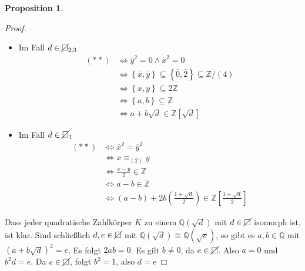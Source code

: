 \documentclass[
twoside=semi,
fontsize=12,
DIV=12, 
cleardoublepage=current,
leqno,
headings=optiontoheadandtoc, 
toc=idx
]{scrbook}
\newcommand{\Z}{\mathbb{Z}}
\newcommand{\Q}{\mathbb{Q}}
\newcommand{\nsquare}{\cancel{\square}}
\newcommand{\brac}[1]{\left( #1 \right)}
\newcommand{\set}[1]{\left\{ #1 \right\}}
\theoremstyle{definition}
\newtheorem{proposition}[definition]{Proposition}
\begin{document}
\begin{proposition}
\begin{proof}
 		\begin{itemize}
 			\item Im Fall $d\in \nsquare_{2,3}$
 			\begin{align*}
 				(**) &\Leftrightarrow \overline{y}^2 = 0 \land \overline{x}^2 = 0\\
 				&\Leftrightarrow \set{\overline{x},\overline{y}} \subseteq \set{\overline{0}, \overline{2}} \subseteq \Z/(4)\\
 				&\Leftrightarrow \set{x,y} \subseteq 2\Z\\
 				&\Leftrightarrow \set{a,b}\subseteq \Z\\
 				&\Leftrightarrow a+b\sqrt{d} \in \Z[\sqrt{d}]
 			\end{align*}
 			
 			\item Im Fall $d\in \nsquare_{1}$
 			\begin{align*}
 				(**) &\Leftrightarrow \overline{x}^2 = \overline{y}^2\\
 				&\Leftrightarrow x \equiv_{(2)} y\\
 				&\Leftrightarrow\frac{x-y}{2} \in \Z\\
 				&\Leftrightarrow a-b \in \Z\\
 				&\Leftrightarrow (a-b) + 2b\brac{\frac{1+\sqrt{d}}{2}} \in \Z[\frac{1+\sqrt{d}}{2}]
 			\end{align*}
 		\end{itemize}
 	
 		Dass jeder quadratische Zahlk\"orper $K$ zu einem $\Q(\sqrt{d})$ mit $d\in \nsquare$ isomorph ist, ist klar.
 		Sind schlie\ss lich $d,e\in \nsquare$ mit $\Q(\sqrt{d}) \cong \Q(\sqrt{e})$, so gibt es $a,b\in \Q$ mit $(a+b\sqrt{d})^2 = e$. Es folgt $2ab = 0$. Es gilt $b\neq 0$, da $e \in \nsquare$. Also
 		$a = 0$ und $b^2d = e$. Da $e\in \nsquare$, folgt $b^2=1$, also $d=e$
 	\end{proof}
 	\end{proposition}
 	\newpage
 	
\end{document}
